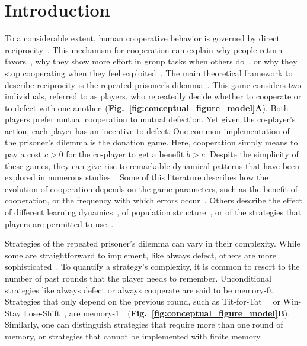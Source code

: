 \documentclass[11pt]{article}
\newcommand{\figref}[1]{{\textbf{Fig.~\ref{#1}}}}
\begin{document}

\section*{Introduction}

To a considerable extent, human cooperative behavior is governed by direct reciprocity~\cite{melis:ptrs:2010,rand:TCS:2013}. 
This mechanism for cooperation can explain why people return favors~\citep{neilson:JEBO:1999}, why they show more effort in group tasks when others do~\citep{fischbacher:AER:2010}, or why they stop cooperating when they feel exploited~\citep{hilbe:ncomms:2014,Xu:NComms:2016}. 
The main theoretical framework to describe reciprocity is the repeated prisoner's dilemma~\cite{axelrod:AAAS:1981, nowak:Science:2006, sigmund2010,Garcia:FRAI:2018,hilbe:Nature:2018}. 
This game considers two individuals, referred to as players, who repeatedly decide whether to cooperate or to defect with one another~(\figref{fig:conceptual_figure_model}\textbf{A}). 
Both players prefer mutual cooperation to mutual defection. 
Yet given the co-player's action, each player has an incentive to defect. 
One common implementation of the prisoner's dilemma is the donation game. 
Here, cooperation simply means to pay a cost $c\!>\!0$ for the co-player to get a benefit $b\!>\!c$. 
Despite the simplicity of these games, they can give rise to remarkable dynamical patterns that have been explored in numerous studies~\citep{frean:PRSB:1994,killingback:PRSB:1999,hauert:JTB:2002b,kurokawa:PRSB:2009,pinheiro:PLoSCB:2014,garcia:jet:2016,mcavoy:PRSA:2019,Kraines:TaD:1989,nowak:Nature:1993,imhof:PNAS:2005,grujic:jtb:2012,van-segbroeck:prl:2012,press:PNAS:2012,stewart:pnas:2013,Toupo:IJBC:2014,stewart:pnas:2014, akin:EGADS:2016,glynatsi:scientific:2020,chen:PNASnexus:2023}.
Some of this literature describes how the evolution of cooperation depends on the game parameters, such as the benefit of cooperation, or the frequency with which errors occur~\citep{boyd:JTB:1989,Hao:PRE:2015,Zhang:GEB:2018,Mamiya:PRE:2020}. 
Others describe the effect of different learning dynamics~\citep{stewart:games:2015,Mcavoy:PNAS:2022}, of population structure~\citep{brauchli:JTB:1999,szabo:PRE:2000b,allen:AmNat:2013,szolnoki:scirep:2014}, or of the strategies that players are permitted to use~\citep{baek:scientific:2016}.  

Strategies of the repeated prisoner's dilemma can vary in their complexity.
While some are straightforward to implement, like always defect, others are more sophisticated~\cite{harper:PLOSONE:2017, knight:PLOSONE:2018}.
To quantify a strategy's complexity, it is common to resort to the number of past rounds that the player needs to remember. 
Unconditional strategies like always defect or always cooperate are said to be \mbox{memory-0}. 
Strategies that only depend on the previous round, such as Tit-for-Tat~~\cite{axelrod:AAAS:1981,Duersch:IJGT:2013} or Win-Stay Lose-Shift~\cite{Kraines:TaD:1989,nowak:Nature:1993}, are \mbox{memory-1}~~(\figref{fig:conceptual_figure_model}\textbf{B}). 
Similarly, one can distinguish strategies that require more than one round of memory, or strategies that cannot be implemented with finite memory~\cite{Garcia:FRAI:2018}. 
\end{document}
